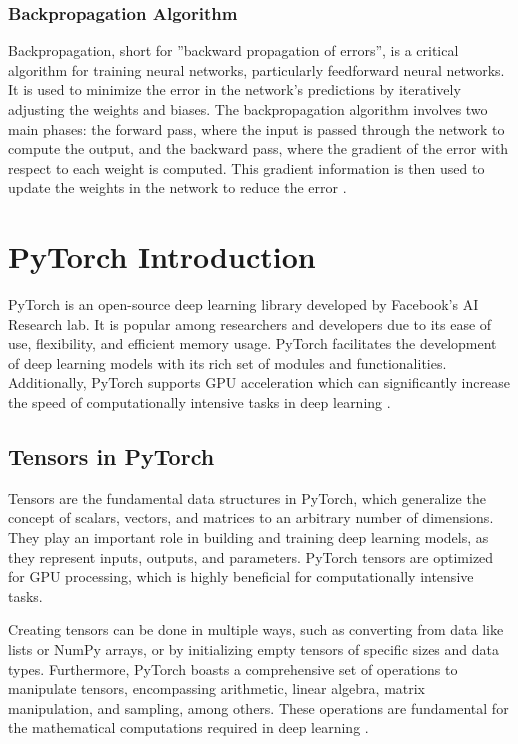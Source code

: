 \subsubsection{Backpropagation Algorithm}

Backpropagation, short for ''backward propagation of errors'', is a critical algorithm for training neural networks, particularly feedforward neural networks. It is used to minimize the error in the network's predictions by iteratively adjusting the weights and biases. The backpropagation algorithm involves two main phases: the forward pass, where the input is passed through the network to compute the output, and the backward pass, where the gradient of the error with respect to each weight is computed. This gradient information is then used to update the weights in the network to reduce the error \cite[p. 113 ff.]{ketkar21}.


\section{PyTorch Introduction}

PyTorch is an open-source deep learning library developed by Facebook's AI Research lab. It is popular among researchers and developers due to its ease of use, flexibility, and efficient memory usage. PyTorch facilitates the development of deep learning models with its rich set of modules and functionalities. Additionally, PyTorch supports GPU acceleration which can significantly increase the speed of computationally intensive tasks in deep learning \cite[p. 28 ff.]{ketkar21}.

\subsection{Tensors in PyTorch}

Tensors are the fundamental data structures in PyTorch, which generalize the concept of scalars, vectors, and matrices to an arbitrary number of dimensions. They play an important role in building and training deep learning models, as they represent inputs, outputs, and parameters. PyTorch tensors are optimized for GPU processing, which is highly beneficial for computationally intensive tasks.

Creating tensors can be done in multiple ways, such as converting from data like lists or NumPy arrays, or by initializing empty tensors of specific sizes and data types. Furthermore, PyTorch boasts a comprehensive set of operations to manipulate tensors, encompassing arithmetic, linear algebra, matrix manipulation, and sampling, among others. These operations are fundamental for the mathematical computations required in deep learning \cite[Tensors]{pytorch_tutorial}.

